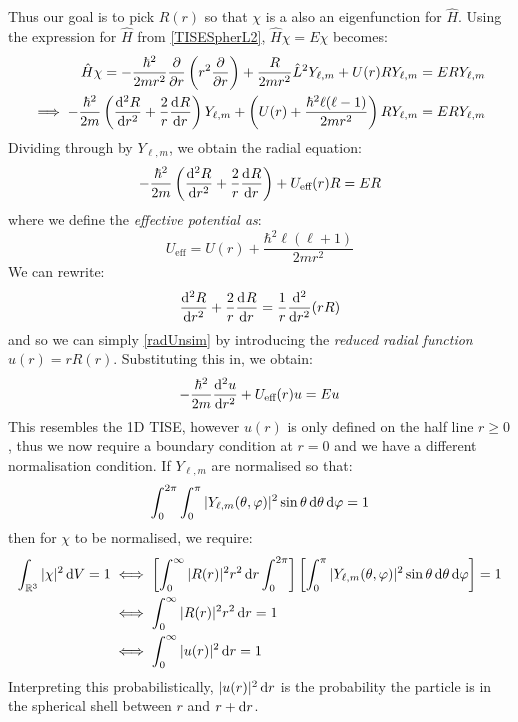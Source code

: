 \documentclass[../main.tex]{subfiles}
\begin{document}
Thus our goal is to pick $R(r)$ so that $\chi$ is a also an eigenfunction for $\hat{H}$.
Using the expression for $\hat{H}$ from \cref{TISESpherL2}, $\hat{H}\chi = E\chi$ becomes:
\begin{align*}
  \hat{H}\chi = - \frac{\hbar^2}{2mr^2}\pderiv{}{r}\left(r^2 \pderiv{}{r}\right) + \frac{R}{2mr^2}\hat{L}^2 Y_{\ell, m} + U(r)RY_{\ell, m} &= ERY_{\ell, m} \\
  \implies -\frac{\hbar^2}{2m}\left(\deriv[2]{R}{r} + \frac{2}{r}\deriv{R}{r}\right)Y_{\ell, m} + \left(U(r) + \frac{\hbar^2\ell(\ell - 1)}{2mr^2}\right)RY_{\ell, m} &= ERY_{\ell, m}
\end{align*}
Dividing through by $Y_{\ell, m}$, we obtain the radial equation:
\begin{equation}
  -\frac{\hbar^2}{2m}\left(\deriv[2]{R}{r} + \frac{2}{r} \deriv{R}{r}\right) + U_{\text{eff}}(r)R = ER \label{radUnsim}
\end{equation}
where we define the \textit{effective potential as}:
\[
  U_{\text{eff}} = U(r) + \frac{\hbar^2 \ell(\ell + 1)}{2mr^2}
\]
We can rewrite:
\[
  \deriv[2]{R}{r} + \frac{2}{r} \deriv{R}{r} = \frac{1}{r}\deriv[2]{}{r}(rR)
\]
and so we can simply \cref{radUnsim} by introducing the \textit{reduced radial function} $u(r) = rR(r)$.
Substituting this in, we obtain:
\begin{equation}
  -\frac{\hbar^2}{2m} \deriv[2]{u}{r} + U_{\text{eff}}(r)u = Eu \label{radU}
\end{equation}
This resembles the 1D TISE, however $u(r)$ is only defined on the half line $r \geq 0$, thus we now require a boundary condition at $r = 0$ and we have a different normalisation condition.
If $Y_{\ell, m}$ are normalised so that:
\begin{equation}
  \int_{0}^{2\pi} \int_{0}^{\pi} |Y_{\ell, m}(\theta, \varphi)|^2 \sin \theta \d{\theta} \d{\varphi} = 1 \label{angNorm}
\end{equation}
then for $\chi$ to be normalised, we require:
\begin{align*}
  \int_{\R^3} |\chi|^2 \d{V} = 1 &\iff \left[\int_{0}^{\infty} |R(r)|^2 r^2 \d{r} \int_{0}^{2\pi}\right] \left[ \int_{0}^{\pi} |Y_{\ell, m}(\theta, \varphi)|^2 \sin \theta \d{\theta} \d{\varphi}\right] = 1 \\
  &\iff \int_{0}^{\infty} |R(r)|^2 r^2 \d{r} = 1 \\
  &\iff \int_{0}^{\infty} |u(r)|^2 \d{r} = 1
\end{align*}
Interpreting this probabilistically, $|u(r)|^2\d{r}$ is the probability the particle is in the spherical shell between $r$ and $r + \d{r}$.
\end{document}
